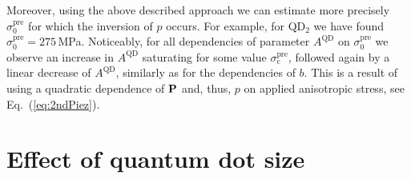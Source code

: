 %
%
Moreover, using the above described approach we can estimate more precisely $\sigma^\mathrm{pre}_\mathrm{0}$ for which the inversion of $p$ occurs. For example, for QD$_2$ we have found $\sigma^\mathrm{pre}_\mathrm{0}=275$$\,$MPa. 
Noticeably, for all dependencies of parameter $A^{\mathrm{QD}}$ on $\sigma^\mathrm{pre}_\mathrm{0}$ we observe an increase in $A^{\mathrm{QD}}$ saturating for some value $\sigma^\mathrm{pre}_\mathrm{c}$, followed again by a linear decrease of $A^{\mathrm{QD}}$, similarly as for the dependencies of $b$. This is a result of using a quadratic dependence of ${\bf P}$ and, thus, $p$ on applied anisotropic stress, see Eq.~(\ref{eq:2ndPiez}).
%












%








\section{Effect of quantum dot size}

